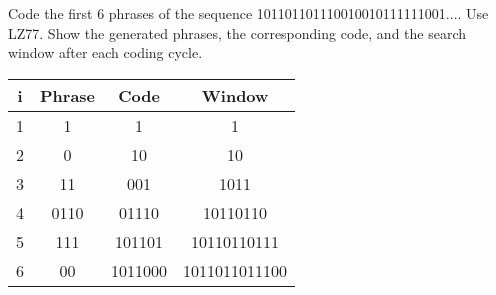 \begin{question}
Code the first 6 phrases of the sequence {101101101110010010111111001...}. Use LZ77. Show the generated phrases, the corresponding code, and the search window after each coding cycle.
\end{question}
\begin{solution}
\begin{tabular}{|c|c|c|c|}
\hline 
i & Phrase & Code & Window \\ 
\hline 
1 & 1 & 1 & 1 \\ 
\hline 
2 & 0 & 10 & 10 \\ 
\hline 
3 & 11 & 001 & 1011 \\ 
\hline 
4 & 0110 & 01110 & 10110110 \\ 
\hline 
5 & 111 & 101101 & 10110110111 \\ 
\hline 
6 & 00 & 1011000 & 1011011011100 \\ 
\hline 
\end{tabular} 
\end{solution}


